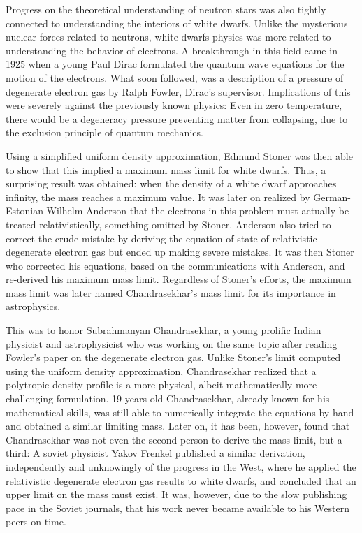 Progress on the theoretical understanding of neutron stars was also tightly connected to understanding the interiors of white dwarfs.
Unlike the mysterious nuclear forces related to neutrons, white dwarfs physics was more related to understanding the behavior of electrons.
A breakthrough in this field came in 1925 when a young Paul Dirac formulated the quantum wave equations for the motion of the electrons\cite{Dirac25}.
What soon followed, was a description of a pressure of degenerate electron gas by Ralph Fowler, Dirac's supervisor\cite{Fowler26}.
Implications of this were severely against the previously known physics:
Even in zero temperature, there would be a degeneracy pressure preventing matter from collapsing, due to the exclusion principle of quantum mechanics.

Using a simplified uniform density approximation, Edmund Stoner was then able to show that this implied a maximum mass limit for white dwarfs.\cite{Stoner30}
Thus, a surprising result was obtained: when the density of a white dwarf approaches infinity, the mass reaches a maximum value.
It was later on realized by German-Estonian Wilhelm Anderson that the electrons in this problem must actually be treated relativistically\cite{Anderson29}, something omitted by Stoner.
Anderson also tried to correct the crude mistake by deriving the equation of state of relativistic degenerate electron gas but ended up making severe mistakes.
It was then Stoner who corrected his equations, based on the communications with Anderson, and re-derived his maximum mass limit.
Regardless of Stoner's efforts, the maximum mass limit was later named Chandrasekhar's mass limit for its importance in astrophysics.

This was to honor Subrahmanyan Chandrasekhar, a young prolific Indian physicist and astrophysicist who was working on the same topic after reading Fowler's paper on the degenerate electron gas.
Unlike Stoner's limit computed using the uniform density approximation, Chandrasekhar realized that a polytropic density profile is a more physical, albeit mathematically more challenging formulation.
19 years old Chandrasekhar, already known for his mathematical skills, was still able to numerically integrate the equations by hand and obtained a similar limiting mass\cite{Cha31}.
Later on, it has been, however, found that Chandrasekhar was not even the second person to derive the mass limit, but a third:\cite{Yakovlev94}
A soviet physicist Yakov Frenkel published a similar derivation, independently and unknowingly of the progress in the West, where he applied the relativistic degenerate electron gas results to white dwarfs, and concluded that an upper limit on the mass must exist\cite{Frenkel28}.
It was, however, due to the slow publishing pace in the Soviet journals, that his work never became available to his Western peers on time.

